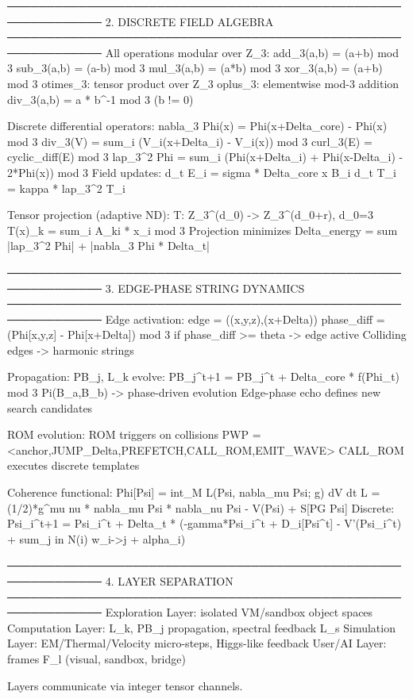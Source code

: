 ──────────────────────────────────────────────────────────────
2. DISCRETE FIELD ALGEBRA
──────────────────────────────────────────────────────────────
All operations modular over Z_3:
  add_3(a,b) = (a+b) mod 3
  sub_3(a,b) = (a-b) mod 3
  mul_3(a,b) = (a*b) mod 3
  xor_3(a,b) = (a+b) mod 3
  otimes_3: tensor product over Z_3
  oplus_3: elementwise mod-3 addition
  div_3(a,b) = a * b^-1 mod 3 (b != 0)

Discrete differential operators:
  nabla_3 Phi(x) = Phi(x+Delta_core) - Phi(x) mod 3
  div_3(V) = sum_i (V_i(x+Delta_i) - V_i(x)) mod 3
  curl_3(E) = cyclic_diff(E) mod 3
  lap_3^2 Phi = sum_i (Phi(x+Delta_i) + Phi(x-Delta_i) - 2*Phi(x)) mod 3
Field updates:
  d_t E_i = sigma * Delta_core x B_i
  d_t T_i = kappa * lap_3^2 T_i

Tensor projection (adaptive ND):
  T: Z_3^(d_0) -> Z_3^(d_0+r), d_0=3
  T(x)_k = sum_i A_ki * x_i mod 3
  Projection minimizes Delta_energy = sum |lap_3^2 Phi| + |nabla_3 Phi * Delta_t|

──────────────────────────────────────────────────────────────
3. EDGE-PHASE STRING DYNAMICS
──────────────────────────────────────────────────────────────
Edge activation:
  edge = ((x,y,z),(x+Delta))
  phase_diff = (Phi[x,y,z] - Phi[x+Delta]) mod 3
  if phase_diff >= theta -> edge active
  Colliding edges -> harmonic strings

Propagation:
  PB_j, L_k evolve: PB_j^{t+1} = PB_j^t + Delta_core * f(Phi_t) mod 3
  Pi(B_a,B_b) -> phase-driven evolution
  Edge-phase echo defines new search candidates

ROM evolution:
  ROM triggers on collisions
  PWP = <anchor,{JUMP_Delta,PREFETCH,CALL_ROM,EMIT_WAVE}>
  CALL_ROM executes discrete templates

Coherence functional:
  Phi[Psi] = int_M L(Psi, nabla_mu Psi; g) dV dt
  L = (1/2)*g^{mu nu} * nabla_mu Psi * nabla_nu Psi - V(Psi) + S[PG Psi]
  Discrete: Psi_i^{t+1} = Psi_i^t + Delta_t * (-gamma*Psi_i^t + D_i[Psi^t] - V'(Psi_i^t) + sum_{j in N(i)} w_{i->j} + alpha_i)

──────────────────────────────────────────────────────────────
4. LAYER SEPARATION
──────────────────────────────────────────────────────────────
Exploration Layer: isolated VM/sandbox object spaces
Computation Layer: L_k, PB_j propagation, spectral feedback L_s
Simulation Layer: EM/Thermal/Velocity micro-steps, Higgs-like feedback
User/AI Layer: frames F_l (visual, sandbox, bridge)

Layers communicate via integer tensor channels.

